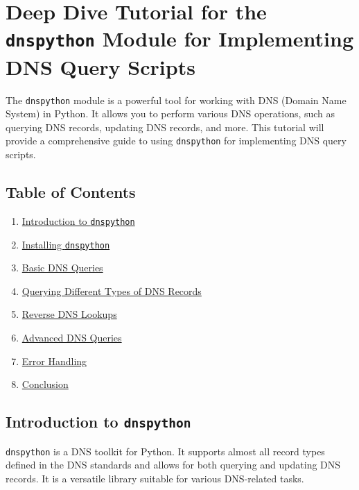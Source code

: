 \documentclass[
  letterpaper,
  DIV=11,
  numbers=noendperiod]{scrreprt}
\providecommand{\tightlist}{%
  \setlength{\itemsep}{0pt}\setlength{\parskip}{0pt}}\usepackage{longtable,booktabs,array}
\begin{document}

\chapter{\texorpdfstring{Deep Dive Tutorial for the \texttt{dnspython}
Module for Implementing DNS Query
Scripts}{Deep Dive Tutorial for the dnspython Module for Implementing DNS Query Scripts}}\label{deep-dive-tutorial-for-the-dnspython-module-for-implementing-dns-query-scripts}

The \texttt{dnspython} module is a powerful tool for working with DNS
(Domain Name System) in Python. It allows you to perform various DNS
operations, such as querying DNS records, updating DNS records, and
more. This tutorial will provide a comprehensive guide to using
\texttt{dnspython} for implementing DNS query scripts.

\section{Table of Contents}\label{table-of-contents-20}

\begin{enumerate}
\def\labelenumi{\arabic{enumi}.}
\tightlist
\item
  \hyperref[introduction-to-dnspython]{Introduction to
  \texttt{dnspython}}
\item
  \hyperref[installing-dnspython]{Installing \texttt{dnspython}}
\item
  \hyperref[basic-dns-queries]{Basic DNS Queries}
\item
  \hyperref[querying-different-types-of-dns-records]{Querying Different
  Types of DNS Records}
\item
  \hyperref[reverse-dns-lookups]{Reverse DNS Lookups}
\item
  \hyperref[advanced-dns-queries]{Advanced DNS Queries}
\item
  \hyperref[error-handling]{Error Handling}
\item
  \hyperref[conclusion]{Conclusion}
\end{enumerate}

\section{\texorpdfstring{Introduction to
\texttt{dnspython}}{Introduction to dnspython}}\label{introduction-to-dnspython}

\texttt{dnspython} is a DNS toolkit for Python. It supports almost all
record types defined in the DNS standards and allows for both querying
and updating DNS records. It is a versatile library suitable for various
DNS-related tasks.
\end{document}
